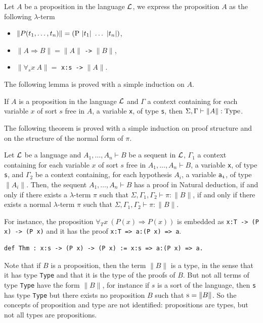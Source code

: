 \documentclass[english]{lipics}
\newcommand\fa{\forall}
\newcommand\lst[1]{{\rm \lstinline{#1}}}
\begin{document}
\begin{definition}
Let $A$ be a proposition in the language ${\cal L}$,
we express the proposition $A$ as the following $\lambda$-term
\begin{itemize}
\item $\|P(t_1,\ldots,t_n)\| = (\mbox{\lst{P}}~|t_1|~\ldots~|t_n|)$,
\item $\|A \Rightarrow B\| = \|A\|$ \lst{->} $ \|B\|$,
\item $\|\fa_s x~A\| =$ \lst{x:s ->} $\|A\|$.
\end{itemize}
\end{definition}

The following lemma is proved with a simple induction on $A$.
\begin{lemma}
If $A$ is a proposition in the language ${\cal L}$ and
$\Gamma$ a context containing for each variable $x$ of sort
$s$ free in $A$, a variable \lst{x}, of type \lst{s}, then
$\Sigma, \Gamma \vdash \|A\|:\mbox{\lst{Type}}$.
\end{lemma}

The following theorem is proved with a simple induction on proof structure
and on the structure of the normal form of $\pi$.
\begin{theorem}
Let ${\cal L}$ be a language and $A_1, \ldots, A_n \vdash B$ be a sequent
in ${\cal L}$, $\Gamma_1$ a context containing
for each variable $x$ of sort $s$ free in $A_1, \ldots, A_n \vdash B$,
a variable \lst{x}, of type \lst{s},
and $\Gamma_2$ be a context containing, for each hypothesis $A_i$,
a variable \lst{a}$_{\tt i}$, of type $\|A_i\|$. Then, the sequent
$A_1, \ldots, A_n \vdash B$ has a proof in Natural deduction, if and only if
there exists a $\lambda$-term $\pi$ such that $\Sigma, \Gamma_1, \Gamma_2
\vdash \pi:\|B\|$, if and only if
there exists a normal $\lambda$-term $\pi$ such that $\Sigma, \Gamma_1, \Gamma_2
\vdash \pi:\|B\|$.
\end{theorem}

For instance, the proposition $\fa_T x~(P(x) \Rightarrow P(x))$
is embedded as \lst{x:T -> (P x) -> (P x)} and
it has the proof \lst{x:T => a:(P x) => a}.

\begin{lstlisting}
def Thm : x:s -> (P x) -> (P x) := x:s => a:(P x) => a.
\end{lstlisting}

Note that if $B$ is a proposition, then the term $\|B\|$ is a type, in
the sense that it has type \lst{Type} and that it is the type of the
proofs of $B$. But not all
terms of type \lst{Type} have the form $\|B\|$, for instance if $s$ is
a sort of the language, then \lst{s} has type \lst{Type} but there exists
no proposition $B$ such that $\mbox{\lst{s}} = \|B\|$.  So the
concepts of proposition and type are not identified: propositions are
types, but not all types are propositions.
\end{document}
